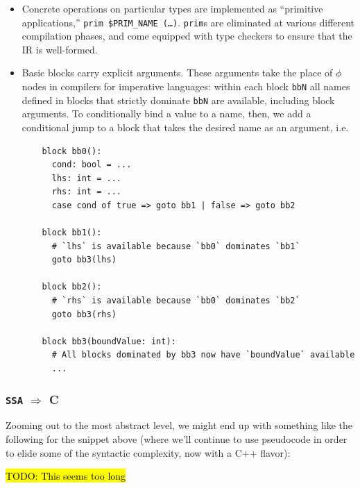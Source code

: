 \documentclass[leqno,11pt]{article}
\begin{document}
\begin{itemize}
\item Concrete operations on particular types are implemented as ``primitive
  applications,'' \texttt{prim \$PRIM\_NAME (\dots)}. \texttt{prim}s are
  eliminated at various different compilation phases, and come equipped with type
  checkers to ensure that the IR is well-formed.
\item Basic blocks carry explicit arguments. These arguments take the place of
  $\phi$ nodes in compilers for imperative languages: within each block
  \texttt{bbN} all names defined in blocks that strictly dominate \texttt{bbN}
  are available, including block arguments. To conditionally bind a value to a
  name, then, we add a conditional jump to a block that takes the desired name
  as an argument, i.e.

  \begin{verbatim}
    block bb0():
      cond: bool = ...
      lhs: int = ...
      rhs: int = ...
      case cond of true => goto bb1 | false => goto bb2

    block bb1():
      # `lhs` is available because `bb0` dominates `bb1`
      goto bb3(lhs)

    block bb2():
      # `rhs` is available because `bb0` dominates `bb2`
      goto bb3(rhs)

    block bb3(boundValue: int):
      # All blocks dominated by bb3 now have `boundValue` available
      ...
  \end{verbatim}

\end{itemize}

\subsubsection{\texttt{SSA} $\Rightarrow$ C}
Zooming out to the most abstract level, we might end up with something like the
following for the snippet above (where we'll continue to use pseudocode in order
to elide some of the syntactic complexity, now with a C++ flavor):

\hl{TODO: This seems too long}
\end{document}
